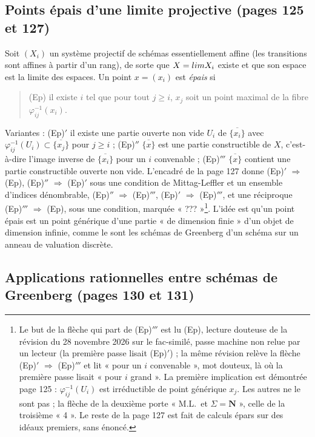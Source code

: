 \documentclass[11pt,a4paper]{article}
\begin{document}
\subsection*{Points épais d'une limite projective (pages 125 et 127)}

Soit $(X_i)$ un système projectif de schémas essentiellement affine (les
transitions sont affines à partir d'un rang), de sorte que $X = \varprojlim X_i$
existe et que son espace est la limite des espaces. Un point $x = (x_i)$ est
\emph{épais} si
\begin{quote}
(Ep) il existe $i$ tel que pour tout $j \geq i$, $x_j$ soit un point maximal de
la fibre $\varphi_{ij}^{-1}(x_i)$.
\end{quote}
Variantes : (Ep)$'$ il existe une partie ouverte non vide $U_i$ de
$\overline{\{x_i\}}$ avec $\varphi_{ij}^{-1}(U_i) \subset \overline{\{x_j\}}$ pour
$j \geq i$ ; (Ep)$''$ $\overline{\{x\}}$ est une partie constructible de $X$,
c'est-à-dire l'image inverse de $\overline{\{x_i\}}$ pour un $i$ convenable ; (Ep)$'''$
$\overline{\{x\}}$ contient une partie constructible ouverte non vide.
L'encadré de la page 127 donne (Ep)$'$ $\Rightarrow$ (Ep), (Ep)$''$
$\Rightarrow$ (Ep)$'$ sous une condition de Mittag-Leffler et un ensemble
d'indices dénombrable, (Ep)$''$ $\Rightarrow$ (Ep)$'''$, (Ep)$'$ $\Rightarrow$ (Ep)$'''$, et une
réciproque (Ep)$'''$ $\Rightarrow$ (Ep), sous une condition, marquée
« ??? »\footnote{Le but de la flèche qui part de (Ep)$'''$ est lu (Ep),
lecture douteuse de la révision du 28 novembre 2026 sur le fac-similé, passe machine non relue par un lecteur (la première passe lisait (Ep)$'$) ; la même révision
relève la flèche (Ep)$'$ $\Rightarrow$ (Ep)$'''$ et lit « pour un $i$
convenable », mot douteux, là où la première passe lisait « pour $i$
grand ». La première
implication est démontrée page 125 : $\varphi_{ij}^{-1}(U_i)$ est irréductible
de point générique $x_j$. Les autres ne le sont pas ; la flèche de la
deuxième porte « M.L.\ et $\Sigma = \mathbf{N}$ », celle de la troisième « 4 ». Le
reste de la page 127 est fait de calculs épars sur des idéaux premiers, sans
énoncé.}. L'idée est qu'un point épais est un point générique d'une partie
« de dimension finie » d'un objet de dimension infinie, comme le sont les
schémas de Greenberg d'un schéma sur un anneau de valuation discrète.

\subsection*{Applications rationnelles entre schémas de Greenberg (pages 130 et 131)}
\end{document}
